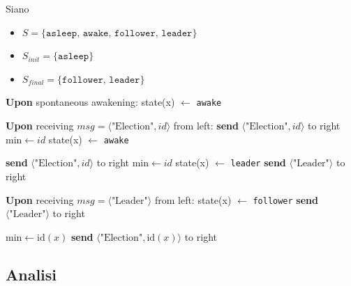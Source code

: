 Siano
\begin{itemize}
    \item $S = \{\texttt{asleep, awake, follower, leader}\}$
    \item $S_{init} = \{\texttt{asleep}\}$
    \item $S_{final} = \{\texttt{follower, leader}\}$
\end{itemize}

\begin{algorithm}
\caption{All The Way}
\begin{algorithmic}[1]
    \Statex \textbf{Upon} spontaneous awakening:
        \State {}
        \State state(x) $\gets$ \texttt{awake}
    \EndIf

    \Statex
    \Statex \textbf{Upon} receiving $msg = \langle \text{"Election"}, id\rangle$ from left:
        \State {}
            \State \textbf{send} $\langle \text{"Election"}, id \rangle$ to right
            \State $\text{min} \gets id$
        \EndIf
        \State state(x) $\gets$ \texttt{awake}
    \EndIf
    
    \Statex
                \State \textbf{send} $\langle \text{"Election"}, id \rangle$ to right
                \State $\text{min} \gets id$
            \Else 
                    \State state(x) $\gets$ \texttt{leader}
                    \State \textbf{send} $\langle \text{"Leader"}\rangle$ to right
                \EndIf
            \EndIf
    \EndIf

    \Statex
    \Statex \textbf{Upon} receiving $msg = \langle \text{"Leader"}\rangle$ from left:
        \State state(x) $\gets$ \texttt{follower}
        \State \textbf{send} $\langle \text{"Leader"}\rangle$ to right
    \EndIf

    \Statex
        \State $\text{min} \gets \text{id}(x)$
        \State \textbf{send} $\langle \text{"Election"}, \text{id}(x)\rangle$ to right
    \EndProcedure
\end{algorithmic}
\end{algorithm}

\newpage

\subsection{Analisi}

